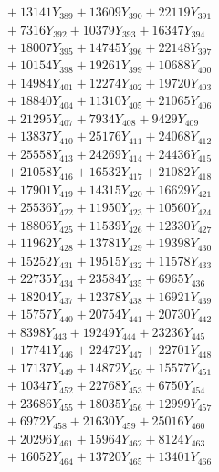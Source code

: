 \documentclass[a4paper,10pt]{article}
\begin{document}
{\begin{align}
&\;  + 13141 Y_{389} + 13609 Y_{390} + 22119 Y_{391} \\[0.3ex]
&\;  + 7316 Y_{392} + 10379 Y_{393} + 16347 Y_{394} \\[0.3ex]
&\;  + 18007 Y_{395} + 14745 Y_{396} + 22148 Y_{397} \\[0.3ex]
&\;  + 10154 Y_{398} + 19261 Y_{399} + 10688 Y_{400} \\[0.3ex]
&\;  + 14984 Y_{401} + 12274 Y_{402} + 19720 Y_{403} \\[0.3ex]
&\;  + 18840 Y_{404} + 11310 Y_{405} + 21065 Y_{406} \\[0.3ex]
&\;  + 21295 Y_{407} + 7934 Y_{408} + 9429 Y_{409} \\[0.3ex]
&\;  + 13837 Y_{410} + 25176 Y_{411} + 24068 Y_{412} \\[0.3ex]
&\;  + 25558 Y_{413} + 24269 Y_{414} + 24436 Y_{415} \\[0.3ex]
&\;  + 21058 Y_{416} + 16532 Y_{417} + 21082 Y_{418} \\[0.5ex]\allowbreak
&\;  + 17901 Y_{419} + 14315 Y_{420} + 16629 Y_{421} \\[0.3ex]
&\;  + 25536 Y_{422} + 11950 Y_{423} + 10560 Y_{424} \\[0.3ex]
&\;  + 18806 Y_{425} + 11539 Y_{426} + 12330 Y_{427} \\[0.3ex]
&\;  + 11962 Y_{428} + 13781 Y_{429} + 19398 Y_{430} \\[0.3ex]
&\;  + 15252 Y_{431} + 19515 Y_{432} + 11578 Y_{433} \\[0.3ex]
&\;  + 22735 Y_{434} + 23584 Y_{435} + 6965 Y_{436} \\[0.3ex]
&\;  + 18204 Y_{437} + 12378 Y_{438} + 16921 Y_{439} \\[0.3ex]
&\;  + 15757 Y_{440} + 20754 Y_{441} + 20730 Y_{442} \\[0.3ex]
&\;  + 8398 Y_{443} + 19249 Y_{444} + 23236 Y_{445} \\[0.3ex]
&\;  + 17741 Y_{446} + 22472 Y_{447} + 22701 Y_{448} \\[0.5ex]\allowbreak
&\;  + 17137 Y_{449} + 14872 Y_{450} + 15577 Y_{451} \\[0.3ex]
&\;  + 10347 Y_{452} + 22768 Y_{453} + 6750 Y_{454} \\[0.3ex]
&\;  + 23686 Y_{455} + 18035 Y_{456} + 12999 Y_{457} \\[0.3ex]
&\;  + 6972 Y_{458} + 21630 Y_{459} + 25016 Y_{460} \\[0.3ex]
&\;  + 20296 Y_{461} + 15964 Y_{462} + 8124 Y_{463} \\[0.3ex]
&\;  + 16052 Y_{464} + 13720 Y_{465} + 13401 Y_{466} \\[0.3ex]

\end{align}}
\end{document}
